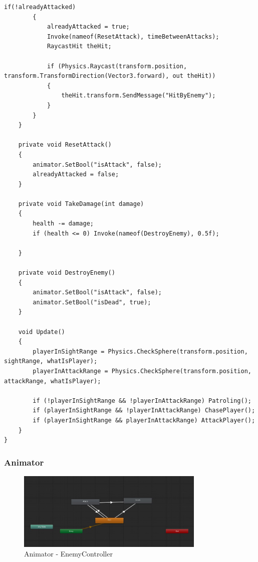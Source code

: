 \documentclass[10pt,a4paper]{article}
\begin{document}
\begin{lstlisting}[caption={Skrypt 'EnemyAi' - zachowanie oraz poruszanie się przeciwników}]
        if(!alreadyAttacked)
        {
            alreadyAttacked = true;
            Invoke(nameof(ResetAttack), timeBetweenAttacks);
            RaycastHit theHit;

            if (Physics.Raycast(transform.position, transform.TransformDirection(Vector3.forward), out theHit))
            {
                theHit.transform.SendMessage("HitByEnemy");
            }
        }
    }

    private void ResetAttack()
    {
        animator.SetBool("isAttack", false);
        alreadyAttacked = false;
    }

    private void TakeDamage(int damage)
    {
        health -= damage;
        if (health <= 0) Invoke(nameof(DestroyEnemy), 0.5f);

    }

    private void DestroyEnemy()
    {
        animator.SetBool("isAttack", false);
        animator.SetBool("isDead", true);
    }

    void Update()
    {
        playerInSightRange = Physics.CheckSphere(transform.position, sightRange, whatIsPlayer);
        playerInAttackRange = Physics.CheckSphere(transform.position, attackRange, whatIsPlayer);

        if (!playerInSightRange && !playerInAttackRange) Patroling();
        if (playerInSightRange && !playerInAttackRange) ChasePlayer();
        if (playerInSightRange && playerInAttackRange) AttackPlayer();
    }
}

\end{lstlisting}

\subsubsection{Animator}

\begin{figure}[ht!]
\begin{center}
\includegraphics[width=0.8\textwidth]{pictures/EnemyAnimator.jpg}
\end{center}
\caption{Animator - EnemyController}
\end{figure}
\end{document}
